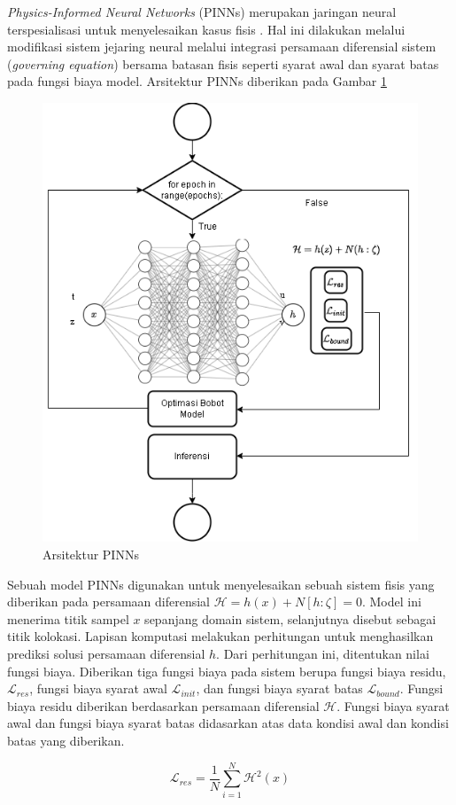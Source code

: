\emph{Physics-Informed Neural Networks} (PINNs) merupakan jaringan neural terspesialisasi untuk menyelesaikan kasus fisis . Hal ini dilakukan melalui modifikasi sistem jejaring neural melalui integrasi persamaan diferensial sistem (\emph{governing equation}) bersama batasan fisis seperti syarat awal dan syarat batas pada fungsi biaya model. Arsitektur PINNs diberikan pada Gambar \ref{Architecture}

\newpage
\begin{figure}[htbp]
    \centering
    \includegraphics[width=0.6\linewidth]{Gambar/PINN.png}
    \caption{Arsitektur PINNs}
    \label{Architecture}
\end{figure}

Sebuah model PINNs digunakan untuk menyelesaikan sebuah sistem fisis yang diberikan pada persamaan diferensial \(\mathcal{H} = h(x) +N[h: \zeta] = 0\). Model ini menerima titik sampel $x$ sepanjang domain sistem, selanjutnya disebut sebagai titik kolokasi. Lapisan komputasi melakukan perhitungan untuk menghasilkan prediksi solusi persamaan diferensial $h$. Dari perhitungan ini, ditentukan nilai fungsi biaya. Diberikan tiga fungsi biaya pada sistem berupa fungsi biaya residu, $\mathcal{L}_{res}$, fungsi biaya syarat awal $\mathcal{L}_{init}$, dan fungsi biaya syarat batas $\mathcal{L}_{bound}$. Fungsi biaya residu diberikan berdasarkan persamaan diferensial $\mathcal{H}$. Fungsi biaya syarat awal dan fungsi biaya syarat batas didasarkan atas data kondisi awal dan kondisi batas yang diberikan.

\begin{equation}
    \label{residual-loss-func}
    \mathcal{L}_{res} = \frac{1}{N}\sum_{i=1}^N\mathcal{H}^2(x)
\end{equation}

